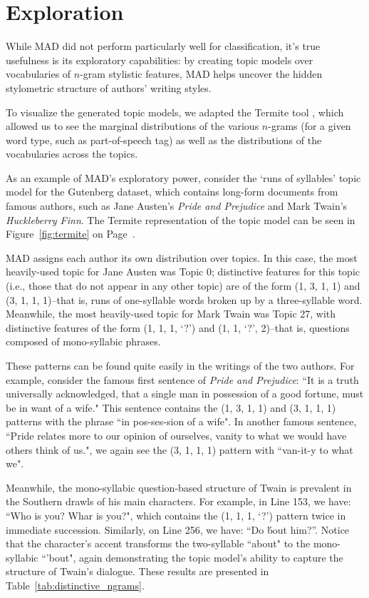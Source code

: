 \documentclass[14pt]{article} %
\theoremstyle{plain}
\theoremstyle{definition}
\theoremstyle{remark}
\begin{document}
\section{Exploration}

While MAD did not perform particularly well for classification, it's true usefulness is its exploratory capabilities: by creating topic models over vocabularies of $n$-gram stylistic features, MAD helps uncover the hidden stylometric structure of authors' writing styles.

To visualize the generated topic models, we adapted the Termite tool \citep{Termite}, which allowed us to see the marginal distributions of the various $n$-grams (for a given word type, such as part-of-speech tag) as well as the distributions of the vocabularies across the topics.

As an example of MAD's exploratory power, consider the `runs of syllables' topic model for the Gutenberg dataset, which contains long-form documents from famous authors, such as Jane Austen's \textit{Pride and Prejudice} and Mark Twain's \textit{Huckleberry Finn}. The Termite representation of the topic model can be seen in Figure~\ref{fig:termite} on Page~\pageref{fig:termite}.

MAD assigns each author its own distribution over topics. In this case, the most heavily-used topic for Jane Austen was Topic 0; distinctive features for this topic (i.e., those that do not appear in any other topic) are of the form (1, 3, 1, 1) and (3, 1, 1, 1)--that is, runs of one-syllable words broken up by a three-syllable word. Meanwhile, the most heavily-used topic for Mark Twain was Topic 27, with distinctive features of the form (1, 1, 1, `?') and (1, 1, `?', 2)--that is, questions composed of mono-syllabic phrases.

These patterns can be found quite easily in the writings of the two authors. For example, consider the famous first sentence of \textit{Pride and Prejudice}: ``It is a truth universally acknowledged, that a single man in possession of a good fortune, must be in want of a wife." This sentence contains the (1, 3, 1, 1) and (3, 1, 1, 1) patterns with the phrase ``in pos-ses-sion of a wife". In another famous sentence, ``Pride relates more to our opinion of ourselves, vanity to what we would have others think of us.", we again see the (3, 1, 1, 1) pattern with ``van-it-y to what we".

Meanwhile, the mono-syllabic question-based structure of Twain is prevalent in the Southern drawls of his main characters. For example, in Line 153, we have: ``Who is you? Whar is you?", which contains the (1, 1, 1, `?') pattern twice in immediate succession. Similarly, on Line 256, we have: ``Do \'bout him?''. Notice that the character's accent transforms the two-syllable ``about" to the mono-syllabic ``'bout", again demonstrating the topic model's ability to capture the structure of Twain's dialogue. These results are presented in Table~\ref{tab:distinctive_ngrams}.
\end{document}
